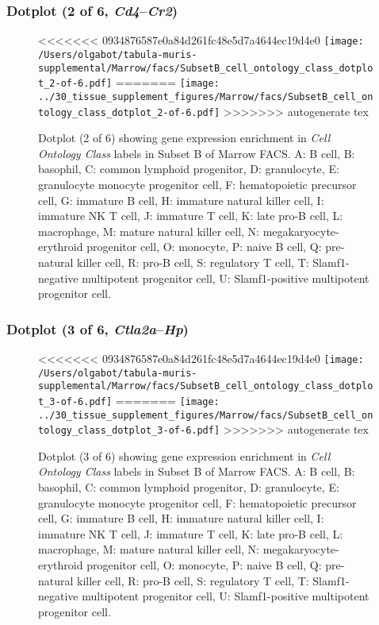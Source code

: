 \clearpage

\subsubsection{Dotplot (2 of 6, \emph{Cd4}--\emph{Cr2})}
\begin{figure}[h]
\centering
<<<<<<< 0934876587e0a84d261fc48e5d7a4644ec19d4e0
\texttt{[image: /Users/olgabot/tabula-muris-supplemental/Marrow/facs/SubsetB\_cell\_ontology\_class\_dotplot\_2-of-6.pdf]}
=======
\texttt{[image: ../30\_tissue\_supplement\_figures/Marrow/facs/SubsetB\_cell\_ontology\_class\_dotplot\_2-of-6.pdf]}
>>>>>>> autogenerate tex

\caption{ Dotplot (2 of 6)  showing gene expression enrichment in \emph{Cell Ontology Class} labels in Subset B of Marrow FACS. A: B cell, B: basophil, C: common lymphoid progenitor, D: granulocyte, E: granulocyte monocyte progenitor cell, F: hematopoietic precursor cell, G: immature B cell, H: immature natural killer cell, I: immature NK T cell, J: immature T cell, K: late pro-B cell, L: macrophage, M: mature natural killer cell, N: megakaryocyte-erythroid progenitor cell, O: monocyte, P: naive B cell, Q: pre-natural killer cell, R: pro-B cell, S: regulatory T cell, T: Slamf1-negative multipotent progenitor cell, U: Slamf1-positive multipotent progenitor cell.}
\end{figure}


\clearpage

\subsubsection{Dotplot (3 of 6, \emph{Ctla2a}--\emph{Hp})}
\begin{figure}[h]
\centering
<<<<<<< 0934876587e0a84d261fc48e5d7a4644ec19d4e0
\texttt{[image: /Users/olgabot/tabula-muris-supplemental/Marrow/facs/SubsetB\_cell\_ontology\_class\_dotplot\_3-of-6.pdf]}
=======
\texttt{[image: ../30\_tissue\_supplement\_figures/Marrow/facs/SubsetB\_cell\_ontology\_class\_dotplot\_3-of-6.pdf]}
>>>>>>> autogenerate tex

\caption{ Dotplot (3 of 6)  showing gene expression enrichment in \emph{Cell Ontology Class} labels in Subset B of Marrow FACS. A: B cell, B: basophil, C: common lymphoid progenitor, D: granulocyte, E: granulocyte monocyte progenitor cell, F: hematopoietic precursor cell, G: immature B cell, H: immature natural killer cell, I: immature NK T cell, J: immature T cell, K: late pro-B cell, L: macrophage, M: mature natural killer cell, N: megakaryocyte-erythroid progenitor cell, O: monocyte, P: naive B cell, Q: pre-natural killer cell, R: pro-B cell, S: regulatory T cell, T: Slamf1-negative multipotent progenitor cell, U: Slamf1-positive multipotent progenitor cell.}
\end{figure}



